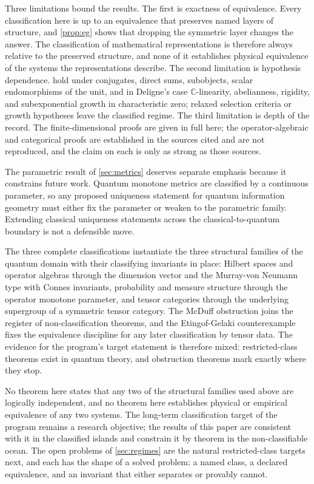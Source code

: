 \documentclass[11pt,letterpaper]{article}
\theoremstyle{definition}
\theoremstyle{remark}
\begin{document}
Three limitations bound the results. The first is exactness of equivalence. Every classification here is up to an equivalence that preserves named layers of structure, and \cref{prop:eg} shows that dropping the symmetric layer changes the answer. The classification of mathematical representations is therefore always relative to the preserved structure, and none of it establishes physical equivalence of the systems the representations describe. The second limitation is hypothesis dependence.  hold under conjugates, direct sums, subobjects, scalar endomorphisms of the unit, and in Deligne's case $\mathbb{C}$-linearity, abelianness, rigidity, and subexponential growth in characteristic zero; relaxed selection criteria or growth hypotheses leave the classified regime. The third limitation is depth of the record. The finite-dimensional proofs are given in full here; the operator-algebraic and categorical proofs are established in the sources cited and are not reproduced, and the claim on each is only as strong as those sources.

The parametric result of \cref{sec:metrics} deserves separate emphasis because it constrains future work. Quantum monotone metrics are classified by a continuous parameter, so any proposed uniqueness statement for quantum information geometry must either fix the parameter or weaken to the parametric family. Extending classical uniqueness statements across the classical-to-quantum boundary is not a defensible move.

The three complete classifications instantiate the three structural families of the quantum domain with their classifying invariants in place: Hilbert spaces and operator algebras through the dimension vector and the Murray-von Neumann type with Connes invariants, probability and measure structure through the operator monotone parameter, and tensor categories through the underlying supergroup of a symmetric tensor category. The McDuff obstruction joins the register of non-classification theorems, and the Etingof-Gelaki counterexample fixes the equivalence discipline for any later classification by tensor data. The evidence for the program's target statement is therefore mixed: restricted-class theorems exist in quantum theory, and obstruction theorems mark exactly where they stop.

No theorem here states that any two of the structural families used above are logically independent, and no theorem here establishes physical or empirical equivalence of any two systems. The long-term classification target of the program remains a research objective; the results of this paper are consistent with it in the classified islands and constrain it by theorem in the non-classifiable ocean. The open problems of \cref{sec:regimes} are the natural restricted-class targets next, and each has the shape of a solved problem: a named class, a declared equivalence, and an invariant that either separates or provably cannot.
\end{document}
